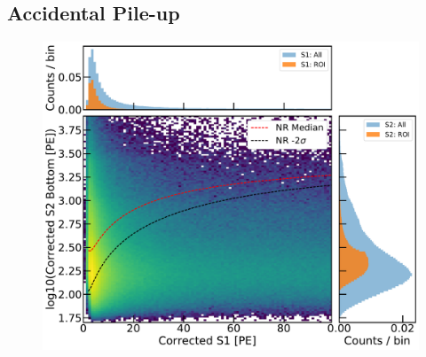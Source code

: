 \subsection{Accidental Pile-up}



\begin{figure}[tbp]
\centering
\includegraphics[width=\columnwidth]{Plots/ac_s2s1_distribution_fv1_blessed_sr1.pdf}
\caption{\label{fig:ac_bg} 
}
\end{figure}

